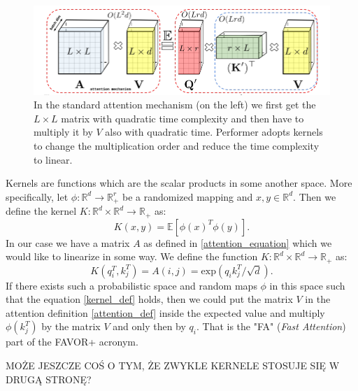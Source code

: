 \documentclass[magisterska,en]{pracamgr}
\begin{document}
\begin{figure}[H]
\centering
\includegraphics[scale=0.5]{./images/performer.png}
\caption{In the standard attention mechanism (on the left) we first get the $L\times L$ matrix with quadratic time complexity and then have to multiply it by $V$ also with quadratic time. Performer adopts kernels to change the multiplication order and reduce the time complexity to linear.}
\label{performer_idea}
\end{figure}




Kernels are functions which are the scalar products in some another space. More specifically, let $\phi : \mathbb{R}^d \rightarrow \mathbb{R}^r_+$ be a randomized mapping and $x, y \in \mathbb{R}^d$. Then we define the kernel $K:\mathbb{R}^d \times \mathbb{R}^d \rightarrow \mathbb{R}_+$ as:
\begin{equation}
    K(x,y) = \mathbb{E} \left[\phi(x)^T\phi(y)\right].
\end{equation}\label{kernel_def}
In our case we have a matrix $A$ as defined in \ref{attention_equation} which we would like to linearize in some way. We define the function $K:\mathbb{R}^d \times \mathbb{R}^d \rightarrow \mathbb{R}_+$ as:
\begin{equation}
    K(q_i^T, k_j^T) = A(i,j) = \textrm{exp}\left(q_i k_j^T/\sqrt{d}\right).
\end{equation}\label{kernel_attention}
If there exists such a probabilistic space and random maps $\phi$ in this space such that the equation \ref{kernel_def} holds, then we could put the matrix $V$ in the attention definition \ref{attention_def} inside the expected value and multiply $\phi(k_j^T)$ by the matrix $V$ and only then by $q_i$. That is the "FA" (\textit{Fast Attention}) part of the FAVOR+ acronym.


MOŻE JESZCZE COŚ O TYM, ŻE ZWYKLE KERNELE STOSUJE SIĘ W DRUGĄ STRONĘ?
\end{document}
